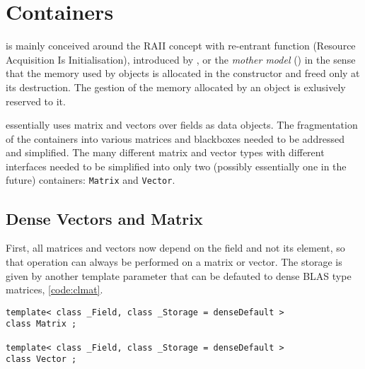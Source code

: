 \section{Containers}\label{sec:container}
%
\linbox is mainly conceived around the RAII concept with re-entrant function
(Resource Acquisition Is Initialisation), introduced by
\cite{stroustrup1994design}, or the \emph{mother model}
(\cite{Dumas:2010:lbpar}) in the sense that the memory used by objects is
allocated in the constructor and freed only at its destruction. The gestion of
the memory allocated by an object is exlusively reserved to it.
%
\par
%
\linbox essentially uses matrix and vectors over fields as data objects.  The
fragmentation of the containers into various matrices and blackboxes needed to
be addressed and simplified.  The many different matrix and vector types with
different interfaces needed to be simplified into  only two (possibly
essentially one in the future) containers: \texttt{Matrix} and \texttt{Vector}.
%
%
\subsection{Dense Vectors and Matrix}
%
First, all matrices and vectors now depend on the field and not its element, so
that operation can always be performed on a matrix or vector. The storage is
given by another template parameter that can be defauted to \eg dense BLAS type
matrices, \cf \cref{code:clmat}.
%
{
\begin{lstlisting}
template< class _Field, class _Storage = denseDefault >
class Matrix ;

template< class _Field, class _Storage = denseDefault >
class Vector ;
\end{lstlisting}
}
%
